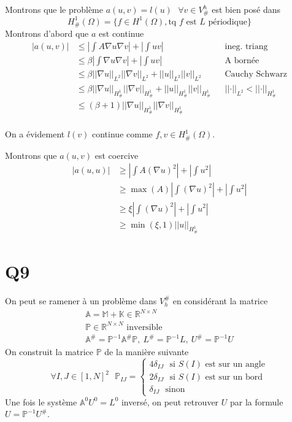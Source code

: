 \documentclass[11pt]{article}
\newcommand{\Am}{\mathbb{A}}
\renewcommand{\P}{\mathbb{P}}
\newcommand{\R}{\mathbb{R}}
\newcommand{\K}{\mathbb{K}}
\newcommand{\M}{\mathbb{M}}
\newcommand{\ms}{~~~}
\newcommand{\norm}[1]{\left|\left|#1\right|\right|}
\begin{document}
Montrons que le problème $a(u,v) = l(u) \ms \forall v \in V^h_{\#}$ est bien posé dans
\begin{equation}
  H^1_{\#}(\Omega) = \bigg\{ f \in H^1(\Omega), \mbox{tq $f$ est $L$ périodique} \bigg\}
\end{equation}
Montrons d'abord que $a$ est continue
\begin{align}
  \label{eq:ac}
  |a(u,v)| &\leq \left| \int A \nabla u \nabla v \right| + \left| \int u v \right| && \mbox{ineg. triang} \\
           &\leq \beta \left| \int \nabla u \nabla v \right| + \left| \int u v \right| && \mbox{A bornée} \\
           &\leq \beta \norm{\nabla u}_{L^2} \norm{\nabla v}_{L^2} + \norm{u}_{L^2}\norm{v}_{L^2} && \mbox{Cauchy Schwarz} \\
           &\leq \beta \norm{\nabla u}_{H^1_{\#}} \norm{\nabla v}_{H^1_{\#}} + \norm{u}_{H^1_{\#}}\norm{v}_{H^1_{\#}} && \norm{\cdot}_{L^2}<\norm{\cdot}_{H^1_{\#}} \\
           &\leq (\beta+1) \norm{\nabla u}_{H^1_{\#}} \norm{\nabla v}_{H^1_{\#}}   \\
\end{align}

On a évidement $l(v)$ continue comme $f, v \in H^1_{\#}(\Omega)$. 

Montrons que $a(u,v)$ est coercive
\begin{align}
  \label{eq:co}
  |a(u,u)| &\geq \left|\int A (\nabla u)^2 \right| + \left|\int u^2 \right| \\
           &\geq \max(A) \left|\int (\nabla u)^2 \right| + \left|\int u^2 \right| \\
           &\geq \xi \left|\int (\nabla u)^2 \right| + \left|\int  u^2 \right| \\
           &\geq \min(\xi,1) \norm{u}_{H^1_{\#}}
\end{align}

\section{Q9}

On peut se ramener à un problème dans $V^{\#}_h$ en considérant la matrice
\begin{gather}
  \Am = \M + \K \in \R^{N\times N } \\
  \P \in \R^{N\times N} \mbox{~inversible}\\
  \Am^{\#} = \P^{-1}\Am^{\#}\P, ~ L^{\#} = \P^{-1} L, ~ U^{\#} = \P^{-1} U 
\end{gather} 
On construit la matrice $\P$ de la manière suivante
\begin{equation}
  \forall I,J \in [1,N]^2 \ms
  \P_{IJ} =
  \begin{cases}
    4 \delta_{IJ} \ms \mbox{si~} S(I) \mbox{~est sur un angle} \\
    2 \delta_{IJ} \ms \mbox{si~} S(I) \mbox{~est sur un bord} \\
    \delta_{IJ} \ms \mbox{sinon}
  \end{cases}
\end{equation}
Une fois le système $\Am^0 U^0 = L^0$ inversé, on peut retrouver $U$ par la formule $U=\P^{-1} U^{\#}$.
\end{document}
